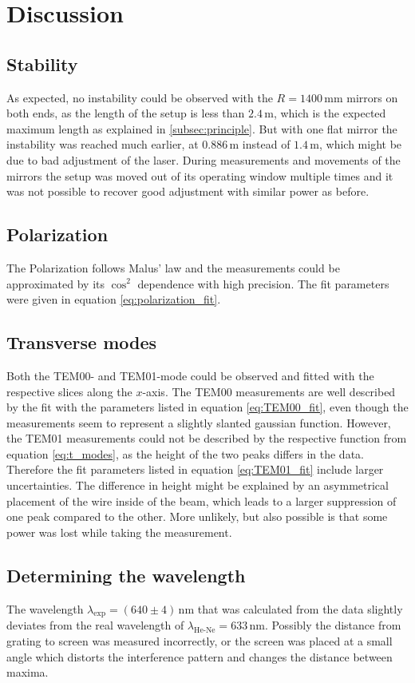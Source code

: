 \section{Discussion}
\label{sec:discussion}
\subsection{Stability}
As expected, no instability could be observed with the $R=1400\,\unit{\mm}$ mirrors on both ends, as the length of the setup is less than $2.4\,\unit{\m}$, 
which is the expected maximum length as explained in \autoref{subsec:principle}. 
But with one flat mirror the instability was reached much earlier, at $0.886\,\unit{\m}$ instead of $1.4\,\unit{\m}$, which might be due to bad adjustment of the laser. 
During measurements and movements of the mirrors the setup was moved out of its operating window multiple times and 
it was not possible to recover good adjustment with similar power as before. 

\subsection{Polarization}
The Polarization follows Malus' law and the measurements could be approximated by its $\cos^2$ dependence with high precision. 
The fit parameters were given in equation \eqref{eq:polarization_fit}. 

\subsection{Transverse modes}
Both the TEM00- and TEM01-mode could be observed and fitted with the respective slices along the $x$-axis. 
The TEM00 measurements are well described by the fit with the parameters listed in equation \eqref{eq:TEM00_fit}, 
even though the measurements seem to represent a slightly slanted gaussian function. 
However, the TEM01 measurements could not be described by the respective function from equation \eqref{eq:t_modes}, %
as the height of the two peaks differs in the data. 
Therefore the fit parameters listed in equation \eqref{eq:TEM01_fit} include larger uncertainties. 
The difference in height might be explained by an asymmetrical placement of the wire inside of the beam, which leads to a larger suppression of one peak compared to the other. 
More unlikely, but also possible is that some power was lost while taking the measurement. 

\subsection{Determining the wavelength}
The wavelength $\lambda_{\text{exp}}=(640\pm4)\,\unit{\nm}$ that was calculated from the data 
slightly deviates from the real wavelength of $\lambda_{\text{He-Ne}}=633\,\unit{\nm}$. 
Possibly the distance from grating to screen was measured incorrectly, 
or the screen was placed at a small angle which distorts the interference pattern and changes the distance between maxima. 